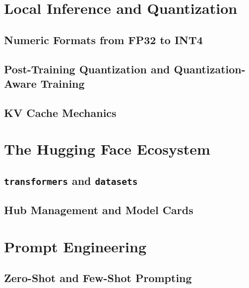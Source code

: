 
\section{Local Inference and Quantization}
\label{sec:quantization}

\subsection{Numeric Formats from FP32 to INT4}


\subsection{Post-Training Quantization and Quantization-Aware Training}

\subsection{KV Cache Mechanics}

\section{The Hugging Face Ecosystem}
\label{sec:huggingface}

\subsection{\texttt{transformers} and \texttt{datasets}}

\subsection{Hub Management and Model Cards}

\section{Prompt Engineering}
\label{sec:prompting}

\subsection{Zero-Shot and Few-Shot Prompting}

